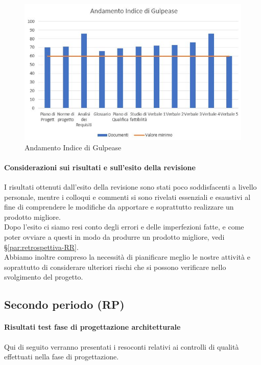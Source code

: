\documentclass[../piano_di_qualifica.tex]{subfiles}
\begin{document}
\begin{figure}[H]
	\centering
	\includegraphics[width=12cm]{img/media_gul.jpg}
	\caption{ Andamento Indice di Gulpease}
\end{figure}

\paragraph{Considerazioni sui risultati e sull’esito della revisione }
I risultati ottenuti dall’esito della revisione sono stati poco soddisfacenti a livello personale, mentre i colloqui e commenti si sono rivelati essenziali e esaustivi al fine di comprendere le modifiche da apportare e soprattutto realizzare un prodotto migliore. \\
Dopo l'esito ci siamo resi conto degli errori e delle imperfezioni fatte, e come poter ovviare a questi in modo da produrre un prodotto migliore, vedi \S\ref{par:retrospettiva-RR}. \\
Abbiamo inoltre compreso la necessità di pianificare meglio le nostre attività e soprattutto di considerare ulteriori rischi che si possono verificare nello svolgimento del progetto.


\subsection{Secondo periodo (RP)}
\label{sub:periodo-RP}
\paragraph{Risultati test fase di progettazione architetturale}
Qui di seguito verranno presentati i resoconti relativi ai controlli di qualità effettuati nella fase di progettazione. \par
\end{document}
